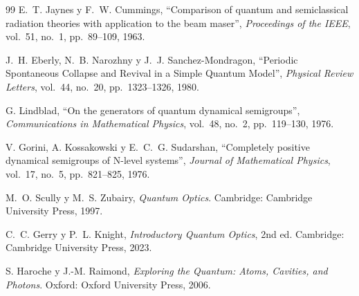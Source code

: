\documentclass[11pt,a4paper,twoside]{report}
\theoremstyle{definition}
\theoremstyle{plain}
\theoremstyle{remark}
\begin{document}
\begin{thebibliography}{99}
E.~T. Jaynes y F.~W. Cummings, ``Comparison of quantum and semiclassical radiation theories with application to the beam maser'', \textit{Proceedings of the IEEE}, vol.~51, no.~1, pp.~89--109, 1963.

J.~H. Eberly, N.~B. Narozhny y J.~J. Sanchez-Mondragon, ``Periodic Spontaneous Collapse and Revival in a Simple Quantum Model'', \textit{Physical Review Letters}, vol.~44, no.~20, pp.~1323--1326, 1980.

G. Lindblad, ``On the generators of quantum dynamical semigroups'', \textit{Communications in Mathematical Physics}, vol.~48, no.~2, pp.~119--130, 1976.

V. Gorini, A. Kossakowski y E.~C.~G. Sudarshan, ``Completely positive dynamical semigroups of N-level systems'', \textit{Journal of Mathematical Physics}, vol.~17, no.~5, pp.~821--825, 1976.

M.~O. Scully y M.~S. Zubairy, \textit{Quantum Optics}. Cambridge: Cambridge University Press, 1997.

C.~C. Gerry y P.~L. Knight, \textit{Introductory Quantum Optics}, 2nd ed. Cambridge: Cambridge University Press, 2023.

S. Haroche y J.-M. Raimond, \textit{Exploring the Quantum: Atoms, Cavities, and Photons}. Oxford: Oxford University Press, 2006.

\end{thebibliography}
\end{document}
